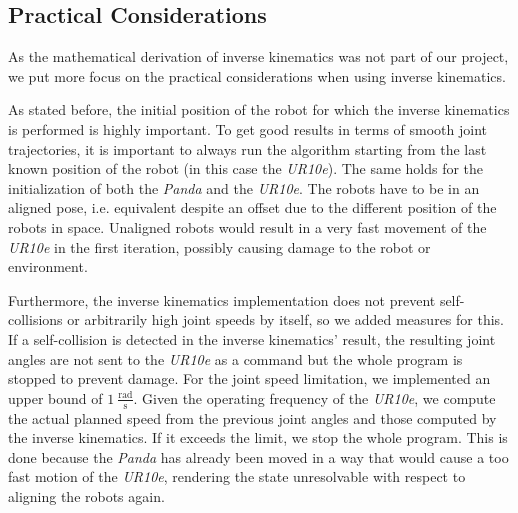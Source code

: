 \documentclass[runningheads]{llncs}
\begin{document}

\subsection{Practical Considerations}
As the mathematical derivation of inverse kinematics was not part of our project, we put more focus on the practical considerations when using inverse kinematics.

As stated before, the initial position of the robot for which the inverse kinematics is performed is highly important. To get good results in terms of smooth joint trajectories, it is important to always run the algorithm starting from the last known position of the robot (in this case the \textit{UR10e}). The same holds for the initialization of both the \textit{Panda} and the \textit{UR10e}. The robots have to be in an aligned pose, i.e. equivalent despite an offset due to the different position of the robots in space. Unaligned robots would result in a very fast movement of the \textit{UR10e} in the first iteration, possibly causing damage to the robot or environment.


Furthermore, the inverse kinematics implementation does not prevent self-collisions or arbitrarily high joint speeds by itself, so we added measures for this. If a self-collision is detected in the inverse kinematics' result, the resulting joint angles are not sent to the \textit{UR10e} as a command but the whole program is stopped to prevent damage. For the joint speed limitation, we implemented an upper bound of $1\ \frac{\mathrm{rad}}{\mathrm{s}}$. Given the operating frequency of the \textit{UR10e}, we compute the actual planned speed from the previous joint angles and those computed by the inverse kinematics. If it exceeds the limit, we stop the whole program. This is done because the \textit{Panda} has already been moved in a way that would cause a too fast motion of the \textit{UR10e}, rendering the state unresolvable with respect to aligning the robots again.
\end{document}
